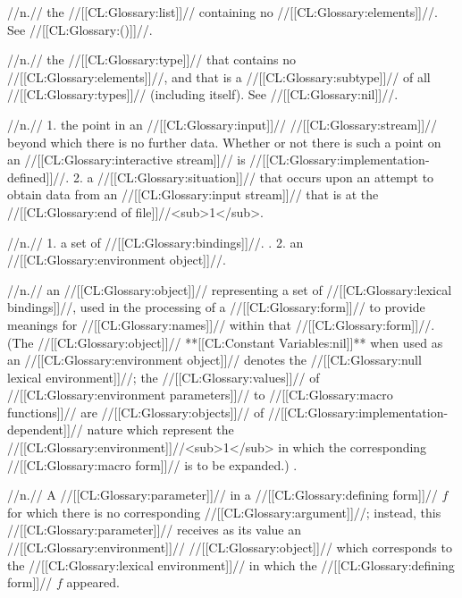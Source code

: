  //n.// the //[[CL:Glossary:list]]// containing no //[[CL:Glossary:elements]]//. See //[[CL:Glossary:()]]//.
 
 //n.// the //[[CL:Glossary:type]]// that contains no //[[CL:Glossary:elements]]//, and that is a //[[CL:Glossary:subtype]]// of all //[[CL:Glossary:types]]// (including itself). See //[[CL:Glossary:nil]]//.

 //n.// 1. the point in an //[[CL:Glossary:input]]// //[[CL:Glossary:stream]]// beyond which there is no further data. Whether or not there is such a point on an //[[CL:Glossary:interactive stream]]// is //[[CL:Glossary:implementation-defined]]//. 2. a //[[CL:Glossary:situation]]// that occurs upon an attempt to obtain data from an //[[CL:Glossary:input stream]]// that is at the //[[CL:Glossary:end of file]]//<sub>1</sub>.


 //n.// 1. a set of //[[CL:Glossary:bindings]]//. \Seesection\IntroToEnvs. 2. an //[[CL:Glossary:environment object]]//. 

 //n.// an //[[CL:Glossary:object]]// representing a set of //[[CL:Glossary:lexical bindings]]//, used in the processing of a //[[CL:Glossary:form]]// to provide meanings for //[[CL:Glossary:names]]// within that //[[CL:Glossary:form]]//.  (The //[[CL:Glossary:object]]// **[[CL:Constant Variables:nil]]** when used as an //[[CL:Glossary:environment object]]// denotes the //[[CL:Glossary:null lexical environment]]//; the //[[CL:Glossary:values]]// of //[[CL:Glossary:environment parameters]]// to //[[CL:Glossary:macro functions]]// are //[[CL:Glossary:objects]]// of //[[CL:Glossary:implementation-dependent]]// nature which represent the //[[CL:Glossary:environment]]//<sub>1</sub> in which the corresponding //[[CL:Glossary:macro form]]// is to be expanded.) \Seesection\EnvObjs.

 //n.// A //[[CL:Glossary:parameter]]// in a //[[CL:Glossary:defining form]]// $f$ for which there is no corresponding //[[CL:Glossary:argument]]//; instead, this //[[CL:Glossary:parameter]]// receives as its value an //[[CL:Glossary:environment]]// //[[CL:Glossary:object]]// which corresponds to the //[[CL:Glossary:lexical environment]]// in which the //[[CL:Glossary:defining form]]// $f$ appeared.

